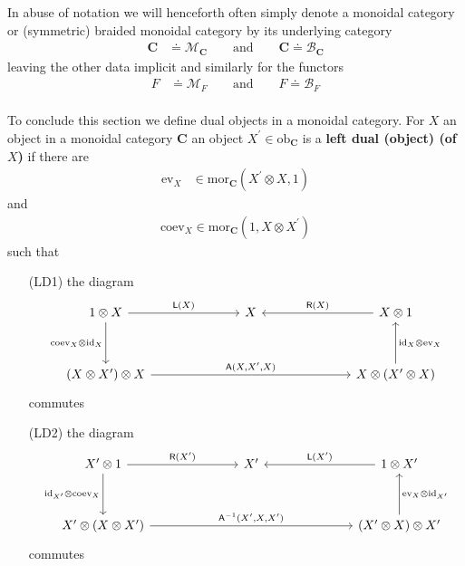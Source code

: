 In abuse of notation we will henceforth often simply denote a monoidal category or (symmetric) braided monoidal category by its underlying category
\begin{align*}
  \mathbf{C}
  &\doteq
  \mathcal{M}_{\mathbf{C}}
  \qquad
  \text{and}
  \qquad
  \mathbf{C}
  \doteq
  \mathcal{B}_{\mathbf{C}}
\end{align*}
leaving the other data implicit and similarly for the functors
\begin{align*}
  F
  &\doteq
  \mathcal{M}_{F}
  \qquad
  \text{and}
  \qquad
  F
  \doteq
  \mathcal{B}_{F}
\end{align*}
\\
To conclude this section we define dual objects in a monoidal category. For $X$ an object in a monoidal category $\mathbf{C}$ an object $X^{\prime} \in \mathrm{ob}_{\mathbf{C}}$ is a \textbf{left dual (object) (of $X$)} if there are
\begin{align*}
  \mathrm{ev}_{X}
  &\in
  \mathrm{mor}_{\mathbf{C}}
  \left(
    X^{\prime}
    \otimes
    X,
    1
  \right)
\end{align*}
and
\begin{align*}
  \mathrm{coev}_{X}
  \in
  \mathrm{mor}_{\mathbf{C}}
  \left(
    1,
    X
    \otimes
    X^{\prime}
  \right)
\end{align*}
such that
\begin{enumerate}
\item[(LD1)]
the diagram
\begin{equation*}
\begin{tikzcd}[row sep=3.3em,column sep=7em]
  1 \otimes X
  \ar{r}{\mathsf{L}(X)}
  \ar{d}[swap]{\mathrm{coev}_{X} \otimes \mathrm{id}_{X}}
  &
  X
  &
  X \otimes 1
  \ar{l}[swap]{\mathsf{R}(X)}
  \\
  (X \otimes X^{\prime}) \otimes X
  \ar{rr}{\mathsf{A}(X,X^{\prime},X)}
  &
  &
  X \otimes (X^{\prime} \otimes X)
  \ar{u}[swap]{\mathrm{id}_{X} \otimes \mathrm{ev}_{X}}
\end{tikzcd}
\end{equation*}
commutes
\item[(LD2)]
the diagram
\begin{equation*}
\begin{tikzcd}[row sep=3.3em,column sep=7em]
  X^{\prime} \otimes 1
  \ar{r}{\mathsf{R}(X^{\prime})}
  \ar{d}[swap]{\mathrm{id}_{X^{\prime}} \otimes \mathrm{coev}_{X}}
  &
  X^{\prime}
  &
  1 \otimes X^{\prime}
  \ar{l}[swap]{\mathsf{L}(X^{\prime})}
  \\
  X^{\prime} \otimes (X \otimes X^{\prime})
  \ar{rr}{\mathsf{A}^{-1}(X^{\prime},X,X^{\prime})}
  &
  &
  (X^{\prime} \otimes X) \otimes X^{\prime}
  \ar{u}[swap]{\mathrm{ev}_{X} \otimes \mathrm{id}_{X^{\prime}}}
\end{tikzcd}
\end{equation*}
commutes
\end{enumerate}
